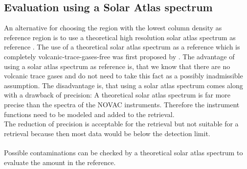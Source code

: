 \subsection*{Evaluation using a Solar Atlas spectrum \label{kuruz}}
An alternative for choosing the region with the lowest column density as reference region is to use a theoretical high resolution solar atlas spectrum as reference \cite{chance2010improved}.
The use of a theoretical solar atlas spectrum as a reference which is completely volcanic-trace-gases-free was first proposed by \cite{lubcke2014bro}.
The advantage of using a solar atlas spectrum as reference is, that we know that there are no volcanic trace gases and do not need to take this fact as a possibly inadmissible assumption. The disadvantage is, that using a solar atlas spectrum comes along with a drawback of precision: A theoretical solar atlas spectrum is far more precise than the spectra of the NOVAC instruments. Therefore the instrument functions need to be modeled and added to the retrieval.\\ 
The reduction of precision is acceptable for the
 retrieval but not suitable for a  retrieval because then most data would be below the detection limit.\\
%
\\
%
Possible contaminations can be checked
by a theoretical solar atlas spectrum to evaluate the  amount in the reference.
%
